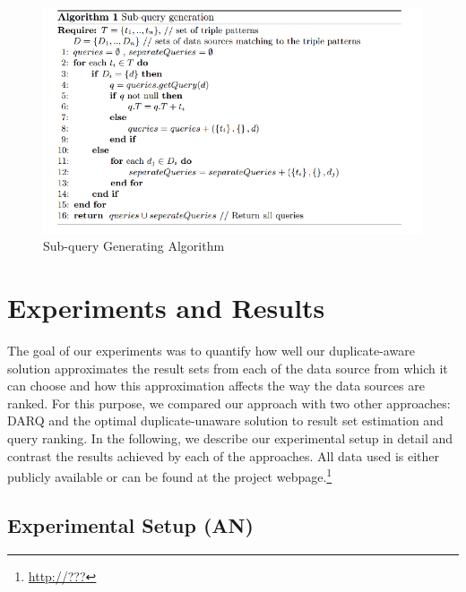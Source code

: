 \documentclass{sig-alternate}  %
\begin{document}
\begin{figure}
\begin{centering}
\includegraphics[scale=0.7]{img/Algo1} 
\par\end{centering}
\caption{Sub-query Generating Algorithm}
\end{figure}

\section{Experiments and Results}
The goal of our experiments was to quantify how well our duplicate-aware solution approximates the result sets from each of the data source from which it can choose and how this approximation affects the way the data sources are ranked.
For this purpose, we compared our approach with two other approaches: DARQ and the optimal duplicate-unaware solution to result set estimation and query ranking. 
In the following, we describe our experimental setup in detail and contrast the results achieved by each of the approaches.
All data used is either publicly available or can be found at the project webpage.\footnote{\url{http://???}}
\subsection{Experimental Setup (AN)}
\end{document}
